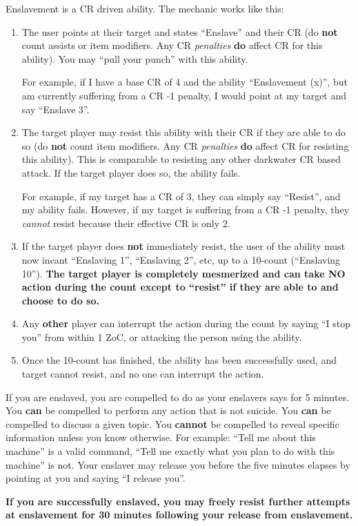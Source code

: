 \documentclass[green]{elementals}
\begin{document}
\name{\gEnslave{}} 

Enslavement is a CR driven ability. The mechanic works like this:

\begin{enumerate}
 \item The user points at their target and states ``Enslave'' and their CR (do {\bf not} count assists or item modifiers. Any CR \emph{penalties} {\bf do} affect CR for this ability). You may ``pull your punch'' with this ability. 
 
 For example, if I have a base CR of 4 and the ability ``Enslavement (x)'', but am currently suffering from a CR -1 penalty, I would point at my target and say ``Enslave 3''. 
 
 \item The target player may resist this ability with their CR if they are able to do so (do {\bf not} count item modifiers. Any CR \emph{penalties} {\bf do} affect CR for resisting this ability). This is comparable to resisting any other darkwater CR based attack. If the target player does so, the ability fails. 
 
 For example, if my target has a CR of 3, they can simply say ``Resist'', and my ability fails.
 However, if my target is suffering from a CR -1 penalty, they \emph{cannot} resist because their effective CR is only 2.
 
 \item If the target player does {\bf not} immediately resist, the user of the ability must now incant ``Enslaving 1'', ``Enslaving 2'', etc, up to a 10-count (``Enslaving 10''). {\bf The target player is completely mesmerized and can take NO action during the count except to ``resist'' if they are able to and choose to do so.}
 
 \item Any {\bf other} player can interrupt the action during the count by saying ``I stop you'' from within 1 ZoC, or attacking the person using the ability.
 
 \item Once the 10-count has finished, the ability has been successfully used, and target cannot resist, and no one can interrupt the action.
\end{enumerate}

If you are enslaved, you are compelled to do as your enslavers says for 5 minutes. You {\bf can} be compelled to perform any action that is not suicide. You {\bf can} be compelled  to discuss a given topic. You {\bf cannot} be compelled to reveal specific information unless you know otherwise. For example: ``Tell me about this machine'' is a valid command, ``Tell me exactly what you plan to do with this machine'' is not. Your enslaver may release you before the five minutes elapses by pointing at you and saying ``I release you''.

{\bf If you are successfully enslaved, you may freely resist further attempts at enslavement for 30 minutes following your release from enslavement.}
\end{document}
